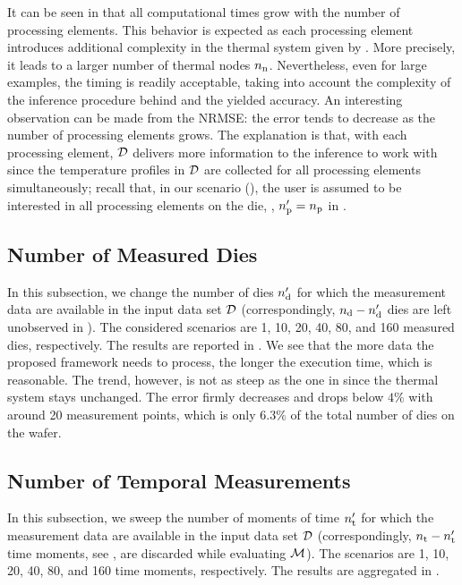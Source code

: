 It can be seen in  that all computational times grow with the number of processing elements. This behavior is expected as each processing element introduces additional complexity in the thermal system given by . More precisely, it leads to a larger number of thermal nodes ${n_\text{n}}$. Nevertheless, even for large examples, the timing is readily acceptable, taking into account the complexity of the inference procedure behind and the yielded accuracy.
An interesting observation can be made from the NRMSE: the error tends to decrease as the number of processing elements grows. The explanation is that, with each processing element, $\mathcal{D}$ delivers more information to the inference to work with since the temperature profiles in $\mathcal{D}$ are collected for all processing elements simultaneously; recall that, in our scenario (), the user is assumed to be interested in all processing elements on the die, \ie, ${n_\text{p}'} = {n_\text{p}}$ in .

\subsection{Number of Measured Dies}

In this subsection, we change the number of dies ${n_\text{d}'}$ for which the measurement data are available in the input data set $\mathcal{D}$ (correspondingly, ${n_\text{d}} - {n_\text{d}'}$ dies are left unobserved in ). The considered scenarios are 1, 10, 20, 40, 80, and 160 measured dies, respectively. The results are reported in .
We see that the more data the proposed framework needs to process, the longer the execution time, which is reasonable. The trend, however, is not as steep as the one in  since the thermal system stays unchanged.
The error firmly decreases and drops below $4\%$ with around 20 measurement points, which is only $6.3\%$ of the total number of dies on the wafer.

\subsection{Number of Temporal Measurements}
In this subsection, we sweep the number of moments of time ${n_\text{t}'}$ for which the measurement data are available in the input data set $\mathcal{D}$ (correspondingly, ${n_\text{t}} - {n_\text{t}'}$ time moments, see , are discarded while evaluating $\model$). The scenarios are 1, 10, 20, 40, 80, and 160 time moments, respectively. The results are aggregated in .


